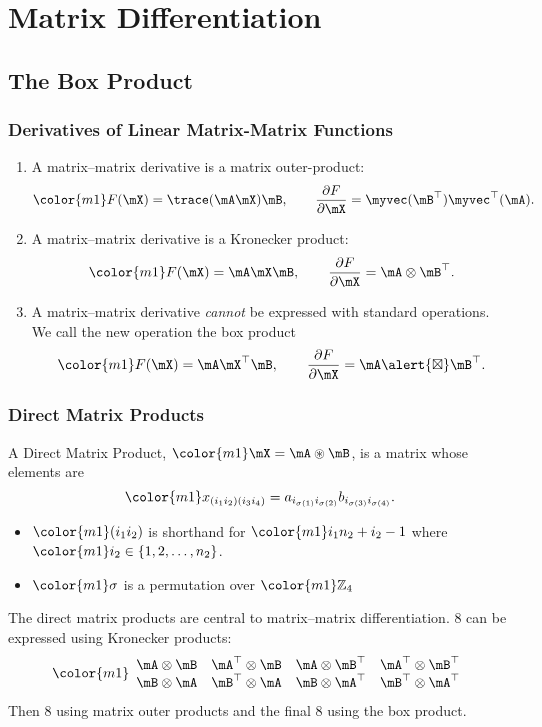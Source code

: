 \section{Matrix Differentiation}
\subsection{The Box Product}

\begin{frame}
\frametitle{Derivatives of Linear Matrix-Matrix Functions}
\begin{enumerate}
\item A matrix--matrix derivative is a
  matrix outer-product:
$$\color{m1} F(\mX) = \trace(\mA\mX)\mB,\qquad\frac{\partial
    F}{\partial\mX} = \myvec(\mB^\top)\myvec^\top(\mA).
$$
\item 
A matrix--matrix derivative is a Kronecker product:
$$\color{m1} F(\mX) = \mA\mX\mB,\qquad\frac{\partial
    F}{\partial\mX} = \mA\otimes\mB^\top.
$$
\item
A matrix--matrix derivative \emph{cannot} be expressed
with standard operations.  We call the new operation the \alert{box
  product}
$$\color{m1} F(\mX) = \mA\mX^\top\mB,\qquad\frac{\partial
    F}{\partial\mX} = \mA\alert{\boxtimes}\mB^\top.
$$
\end{enumerate}
\end{frame}

\begin{frame}
\frametitle{Direct Matrix Products}
A \alert{Direct Matrix Product}, $\color{m1}\mX=\mA\circledast\mB$, is
a matrix whose elements are
$$\color{m1}
x_{(i_1i_2)(i_3i_4)}=a_{i_{\sigma(1)}i_{\sigma(2)}}b_{i_{\sigma(3)}i_{\sigma(4)}}.
$$ 
\vspace{-.5cm}

\begin{itemize}
\item $\color{m1}(i_1i_2)$ is shorthand for $\color{m1}i_1n_2+i_2-1$
  where $\color{m1}i_2\in\{1,2,\ldots,n_2\}$.
\item  $\color{m1}\sigma$ is a permutation over $\color{m1}\mathbb{Z}_4$
\end{itemize}
The direct matrix products are central to matrix--matrix
differentiation.  8 can be expressed using Kronecker products:
$$
\color{m1}
\begin{array}{cccc}
\mA\otimes\mB     & \mA^\top\otimes\mB &
\mA\otimes\mB^\top & \mA^\top\otimes\mB^\top \\
\mB\otimes\mA     & \mB^\top\otimes\mA &
\mB\otimes\mA^\top & \mB^\top\otimes\mA^\top
\end{array}
$$
Then 8 using matrix outer products and the \alert{final 8 using the box product}.
\end{frame}

